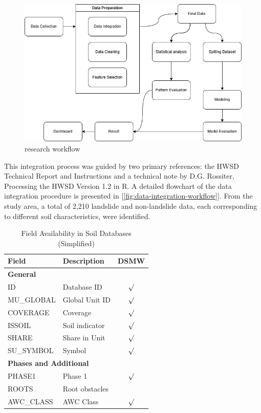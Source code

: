 \begin{figure}[htbp]
    \centerline{\includegraphics[width=\linewidth]{fig2.png}}
    \caption{research workflow}
    \label{fig:research-workflow}
\end{figure}
This integration process was guided by two primary references: the HWSD Technical Report and Instructions and a technical note by D.G. Rossiter, Processing the HWSD Version 1.2 in R. A detailed flowchart of the data integration procedure is presented in [\ref{fig:data-integration-workflow}]. From the study area, a total of 2,210 landslide and non-landslide data, each corresponding to different soil characteristics, were identified.

\begin{table}[H]
\caption{Field Availability in Soil Databases (Simplified)}
\centering
\begin{tabular}{|p{2cm}|p{2.8cm}|c|}
\hline
\textbf{Field} & \textbf{Description} & \textbf{DSMW} \\
\hline
\multicolumn{3}{|l|}{\textbf{General}} \\
\hline
ID & Database ID & $\surd$ \\
MU\_GLOBAL & Global Unit ID & $\surd$ \\
COVERAGE & Coverage & $\surd$ \\
ISSOIL & Soil indicator & $\surd$ \\
SHARE & Share in Unit & $\surd$ \\
SU\_SYMBOL & Symbol & $\surd$ \\
\hline
\multicolumn{3}{|l|}{\textbf{Phases and Additional}} \\
\hline
PHASE1 & Phase 1 & $\surd$ \\
ROOTS & Root obstacles &  \\
AWC\_CLASS & AWC Class & $\surd$ \\
\hline
\end{tabular}
\label{tab:soil_field_availability_small}
\end{table}

